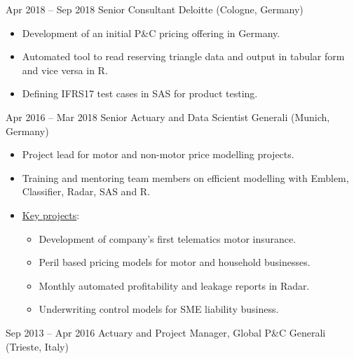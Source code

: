 \documentclass[a4paper,]{fortysecondscv}
\begin{document}
\begin{cvtable}
		\cvitem
			{Apr 2018 -- Sep 2018}
			{Senior Consultant}
			{Deloitte (Cologne, Germany)}
			{
				\vspace{-\topsep}
				\begin{itemize}[nosep, leftmargin=0pt] %
  					\item Development of an initial P\&C pricing offering in Germany.
  					\item Automated tool to read reserving triangle data and output in tabular form and vice versa in R.
  					\item Defining IFRS17 test cases in SAS for product testing.
				\end{itemize}
			}
        \vspace{\topsep}
		\cvitem
			{Apr 2016 -- Mar 2018}
			{Senior Actuary and Data Scientist}
			{Generali (Munich, Germany)}
			{
				\vspace{-\topsep}
				\begin{itemize}[nosep, leftmargin=0pt] %
                    \item Project lead for motor and non-motor price modelling projects.
                    \item Training and mentoring team members on efficient modelling with Emblem, Classifier, Radar, SAS and R.
                    \item \underline{Key projects}:
					\begin{itemize}
                        \item Development of company's first telematics motor insurance.
                        \item Peril based pricing models for motor and household businesses.
                        \item Monthly automated profitability and leakage reports in Radar.
                        \item Underwriting control models for SME liability business.
                    \end{itemize}
				\end{itemize}
			}
        \vspace{\topsep}
		\cvitem
			{Sep 2013 -- Apr 2016}
			{Actuary and Project Manager, Global P\&C}
			{Generali (Trieste, Italy)}
			{
				\vspace{-\topsep}
}
\end{cvtable}
\end{document}
